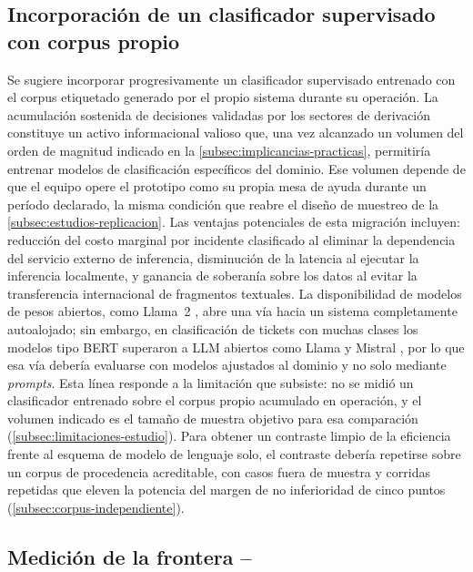 \subsection{Incorporación de un clasificador supervisado con corpus propio}\label{subsec:clasificador-supervisado}

Se sugiere incorporar progresivamente un clasificador supervisado entrenado con el corpus etiquetado generado por el propio sistema durante su operación. La acumulación sostenida de decisiones validadas por los sectores de derivación constituye un activo informacional valioso que, una vez alcanzado un volumen del orden de magnitud indicado en la \autoref{subsec:implicancias-practicas}, permitiría entrenar modelos de clasificación específicos del dominio. Ese volumen depende de que el equipo opere el prototipo como su propia mesa de ayuda durante un período declarado, la misma condición que reabre el diseño de muestreo de la \autoref{subsec:estudios-replicacion}. Las ventajas potenciales de esta migración incluyen: reducción del costo marginal por incidente clasificado al eliminar la dependencia del servicio externo de inferencia, disminución de la latencia al ejecutar la inferencia localmente, y ganancia de soberanía sobre los datos al evitar la transferencia internacional de fragmentos textuales. La disponibilidad de modelos de pesos abiertos, como Llama~2 \parencite{Touvron2023_llama2}, abre una vía hacia un sistema completamente autoalojado; sin embargo, en clasificación de tickets con muchas clases los modelos tipo BERT superaron a LLM abiertos como Llama y Mistral \parencite{paket2024itservice}, por lo que esa vía debería evaluarse con modelos ajustados al dominio y no solo mediante \emph{prompts}. Esta línea responde a la limitación que subsiste: no se midió un clasificador entrenado sobre el corpus propio acumulado en operación, y el volumen indicado es el tamaño de muestra objetivo para esa comparación (\autoref{subsec:limitaciones-estudio}). Para obtener un contraste limpio de la eficiencia frente al esquema de modelo de lenguaje solo, el contraste debería repetirse sobre un corpus de procedencia acreditable, con casos fuera de muestra y corridas repetidas que eleven la potencia del margen de no inferioridad de cinco puntos (\autoref{subsec:corpus-independiente}).

\subsection{Medición de la frontera --}\label{subsec:frontera-sistemas}

